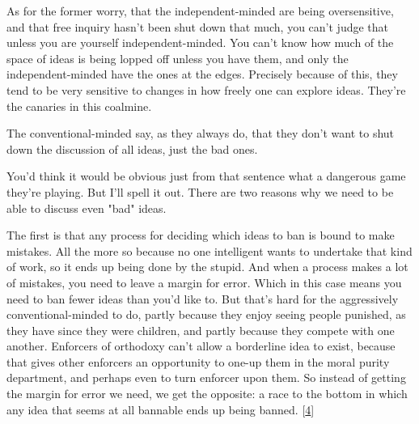 As
                  for the former worry, that the independent-minded are being
                  oversensitive, and that free inquiry hasn't been shut down
                  that much, you can't judge that unless you are yourself
                  independent-minded. You can't know how much of the space of
                  ideas is being lopped off unless you have them, and only the
                  independent-minded have the ones at the edges. Precisely
                  because of this, they tend to be very sensitive to changes in
                  how freely one can explore ideas. They're the canaries in this
                  coalmine.

The conventional-minded say, as they
                  always do, that they don't want to shut down the discussion of
                  all ideas, just the bad ones.

You'd think it would
                  be obvious just from that sentence what a dangerous game
                  they're playing. But I'll spell it out. There are two reasons
                  why we need to be able to discuss even "bad" ideas.

The
                  first is that any process for deciding which ideas to ban is
                  bound to make mistakes. All the more so because no one
                  intelligent wants to undertake that kind of work, so it ends
                  up being done by the stupid. And when a process makes a lot of
                  mistakes, you need to leave a margin for error. Which in this
                  case means you need to ban fewer ideas than you'd like to. But
                  that's hard for the aggressively conventional-minded to do,
                  partly because they enjoy seeing people punished, as they have
                  since they were children, and partly because they compete with
                  one another. Enforcers of orthodoxy can't allow a borderline
                  idea to exist, because that gives other enforcers an
                  opportunity to one-up them in the moral purity department, and
                  perhaps even to turn enforcer upon them. So instead of getting
                  the margin for error we need, we get the opposite: a race to
                  the bottom in which any idea that seems at all bannable ends
                  up being banned.
                  [\href{\#f4n}{4}]

